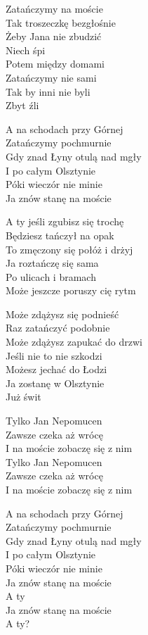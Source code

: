 \begin{text}
    Zatańczymy na moście\\
    Tak troszeczkę bezgłośnie\\
    Żeby Jana nie zbudzić\\
    Niech śpi\\
    Potem między domami\\
    Zatańczymy nie sami\\
    Tak by inni nie byli\\
    Zbyt źli

    A na schodach przy Górnej\\
    Zatańczymy pochmurnie\\
    Gdy znad Łyny otulą nad mgły\\
    I po całym Olsztynie\\
    Póki wieczór nie minie\\
    Ja znów stanę na moście

    A ty jeśli zgubisz się trochę\\
    Będziesz tańczył na opak\\
    To zmęczony się połóż i drżyj\\
    Ja roztańczę się sama\\
    Po ulicach i bramach\\
    Może jeszcze poruszy cię rytm

    Może zdążysz się podnieść\\
    Raz zatańczyć podobnie\\
    Może zdążysz zapukać do drzwi\\
    Jeśli nie to nie szkodzi\\
    Możesz jechać do Łodzi\\
    Ja zostanę w Olsztynie\\
    Już świt

    Tylko Jan Nepomucen\\
    Zawsze czeka aż wrócę\\
    I na moście zobaczę się z nim\\
    Tylko Jan Nepomucen\\
    Zawsze czeka aż wrócę\\
    I na moście zobaczę się z nim

    A na schodach przy Górnej\\
    Zatańczymy pochmurnie\\
    Gdy znad Łyny otulą nad mgły\\
    I po całym Olsztynie\\
    Póki wieczór nie minie\\
    Ja znów stanę na moście\\
    A ty\\
    Ja znów stanę na moście\\
    A ty?
\end{text}
\begin{chord}

\end{chord}